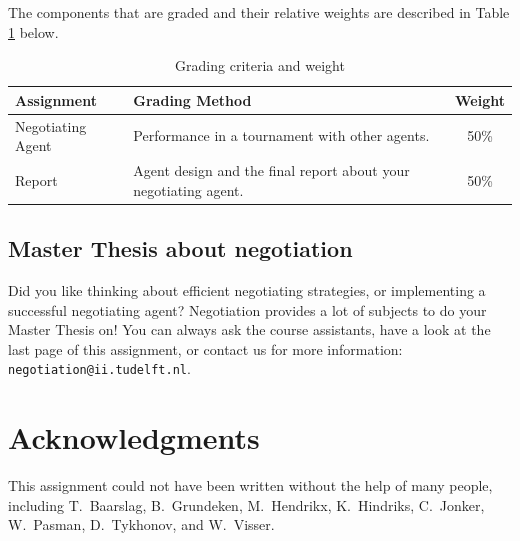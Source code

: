 \documentclass[a4paper]{article}
\begin{document}
The components that are graded and their relative weights are described in Table \ref{tab:grading} below.
\begin{table}[h]
\begin{center}
\begin{tabular}{l p{7cm} c}
\textbf{Assignment} & \textbf{Grading Method} & \textbf{Weight}\\
\hline
\hline
Negotiating Agent & Performance in a tournament with other agents. & 50\%\\
\hline
Report & Agent design and the final report about your negotiating agent. & 50\%\\
\hline 
\end{tabular}
\caption{\label{tab:grading} Grading criteria and weight}
\end{center}
\end{table}

\subsection{Master Thesis about negotiation}
Did you like thinking about efficient negotiating strategies, or implementing a successful negotiating agent? Negotiation provides a lot of subjects to do your Master Thesis on! You can always ask the course assistants, have a look at the last page of this assignment, or contact us for more information: \verb+negotiation@ii.tudelft.nl+.

\section*{Acknowledgments}
This assignment could not have been written without the help of many people, including T.\ Baarslag, B.\ Grundeken, M.\ Hendrikx, K.\ Hindriks, C.\ Jonker, W.\ Pasman, D.\ Tykhonov, and W.\ Visser.



\end{document}
